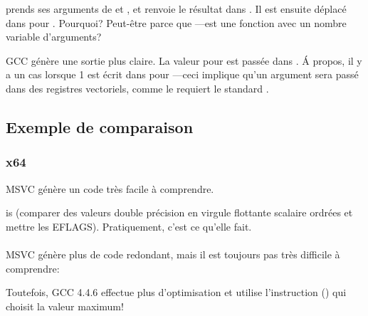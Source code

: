  prends ses arguments de  et , et renvoie le résultat dans
.
Il est ensuite déplacé dans \RDX pour \printf.
Pourquoi?
Peut-être parce que \printf{}---est une fonction avec un nombre variable d'arguments?



GCC génère une sortie plus claire.
La valeur pour \printf est passée dans .
Á propos, il y a un cas lorsque 1 est écrit dans \EAX pour \printf ---ceci implique
qu'un argument sera passé dans des registres vectoriels, comme le requiert le standard
\SysVABI.

\subsection{Exemple de comparaison}



\subsubsection{x64}



MSVC \Optimizing génère un code très facile à comprendre.

 is  (comparer des valeurs double précision en virgule flottante scalaire
ordrées et mettre les EFLAGS). Pratiquement, c'est ce qu'elle fait.\\
\\
MSVC \NonOptimizing génère plus de code redondant, mais il est toujours pas très difficile
à comprendre:



Toutefois, GCC 4.4.6 effectue plus d'optimisation et utilise l'instruction 
() qui choisit la
valeur maximum!



